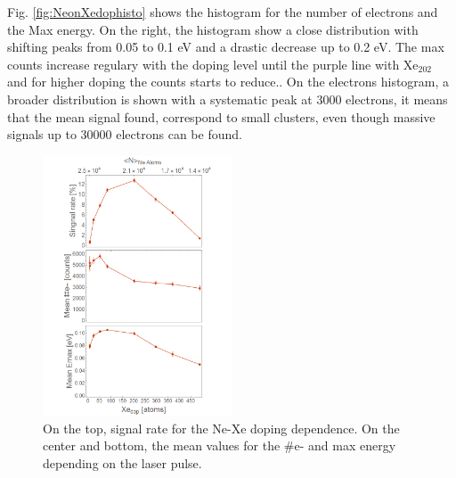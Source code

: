 Fig. \ref{fig:NeonXedophisto} shows the histogram for the number of electrons  and the Max energy. On the right, the histogram show a close distribution with shifting peaks from 0.05 to 0.1 eV and a drastic decrease up to 0.2 eV. The max counts increase regulary with the doping level until the purple line with Xe$_{202}$ and for higher doping the counts starts to reduce.. On the electrons histogram, a broader distribution is shown with a systematic peak at 3000 electrons, it means that the mean signal found, correspond to small clusters, even though  massive signals up to 30000 electrons can be found. 


\begin{figure}[hbtp]
\centering
\includegraphics[width=0.5\textwidth]{../Images/results/MIR_Ne_XeDop_39K/Alltogether.png}
\caption[MIR Ne-Xe. Signal rate and mean values]{On the top, signal rate for the Ne-Xe doping dependence. On the center and bottom, the mean values for the $\#$e- and max energy depending on the laser pulse.}
\label{fig:NeXeall}
\end{figure}

